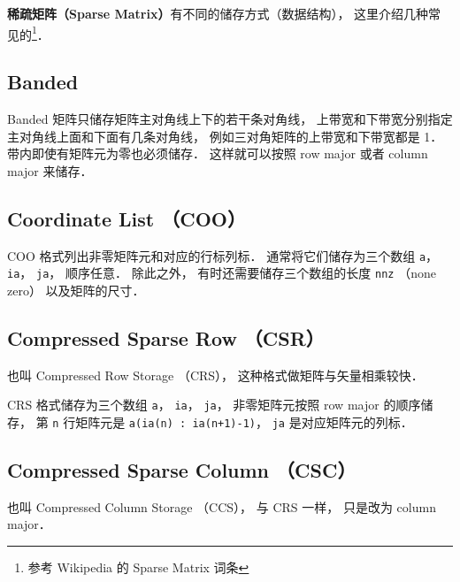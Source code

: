 
\textbf{稀疏矩阵（Sparse Matrix）}有不同的储存方式（数据结构）， 这里介绍几种常见的\footnote{参考 Wikipedia 的 Sparse Matrix 词条}．

\subsection{Banded}
Banded 矩阵只储存矩阵主对角线上下的若干条对角线， 上带宽和下带宽分别指定主对角线上面和下面有几条对角线， 例如三对角矩阵的上带宽和下带宽都是 1． 带内即使有矩阵元为零也必须储存． 这样就可以按照 row major 或者 column major 来储存．

\subsection{Coordinate List （COO）}
COO 格式列出非零矩阵元和对应的行标列标． 通常将它们储存为三个数组 \lstinline|a|， \lstinline|ia|， \lstinline|ja|， 顺序任意． 除此之外， 有时还需要储存三个数组的长度 \lstinline|nnz| （none zero） 以及矩阵的尺寸．

\subsection{Compressed Sparse Row （CSR）}
也叫 Compressed Row Storage （CRS）， 这种格式做矩阵与矢量相乘较快．

CRS 格式储存为三个数组 \lstinline|a|， \lstinline|ia|， \lstinline|ja|， 非零矩阵元按照 row major 的顺序储存， 第 \lstinline|n| 行矩阵元是 \lstinline|a(ia(n) : ia(n+1)-1)|， \lstinline|ja| 是对应矩阵元的列标．

\subsection{Compressed Sparse Column （CSC）}
也叫 Compressed Column Storage （CCS）， 与 CRS 一样， 只是改为 column major．
